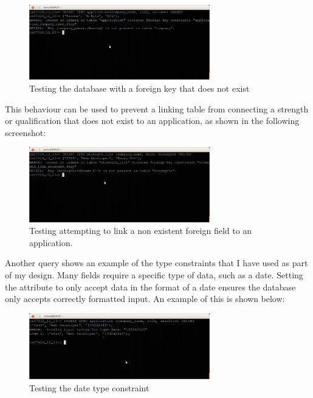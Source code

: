 \documentclass{article}
\begin{document}
\begin{figure}[H]
\centering
\includegraphics[width=0.7\textwidth]{img/test/test-fkey.png}
\caption{Testing the database with a foreign key that does not exist}
\label{fig:test-fkey}
\end{figure}

This behaviour can be used to prevent a linking table from connecting a strength or qualification that does not exist to an application, as shown in the following screenshot:

\begin{figure}[H]
\centering
\includegraphics[width=0.7\textwidth]{img/test/test-fkey-link.png}
\caption{Testing attempting to link a non existent foreign field to an application.}
\label{fig:test-fkey-link}
\end{figure}

Another query shows an example of the type constraints that I have used as part of my design. Many fields require a specific type of data, such as a date. Setting the attribute to only accept data in the format of a date ensures the database only accepts correctly formatted input. An example of this is shown below:

\begin{figure}[H]
\centering
\includegraphics[width=0.7\textwidth]{img/test/test-error-date.png}
\caption{Testing the date type constraint}
\label{fig:test-error-date}
\end{figure}
\end{document}
